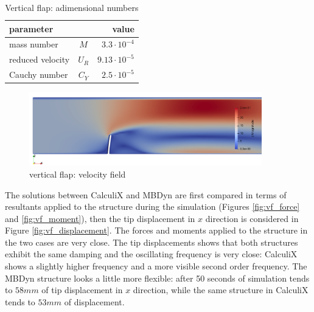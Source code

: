 \begin{table}[!h]
	\begin{center}
		\begin{tabular}{ l c | r } 
			parameter & & value   \\ 
			\hline
			mass number  & $M$ & $3.3\cdot 10^{-4}$     \\
			reduced velocity & $U_R$ & $9.13\cdot 10^{-5}$  \\
			Cauchy number  & $C_Y$ & $2.5\cdot 10^{-5}$  \\			
		\end{tabular}
	\end{center}
	\caption{Vertical flap: adimensional numbers}
	\label{table:ex1-adim}
\end{table}

\begin{figure}[htbp!]
	\centering
	\includegraphics[width=0.9\textwidth]{images/vert_flap/vert_flap1.png}
	\caption{vertical flap: velocity field}
	\label{fig:vf_sol}
\end{figure}


The solutions between CalculiX and MBDyn are first compared in terms of resultants applied to the structure during the simulation (Figures \ref{fig:vf_force} and \ref{fig:vf_moment}), then the tip displacement in $x$ direction is considered in Figure \ref{fig:vf_displacement}. The forces and moments applied to the structure in the two cases are very close. 
The tip displacements shows that both structures exhibit the same damping and the oscillating frequency is very close: CalculiX shows a slightly higher frequency and a more visible second order frequency. The MBDyn structure looks a little more flexible: after 50 seconds of simulation tends to $58mm$ of tip displacement in $x$ direction, while the same structure in CalculiX tends to $53mm$ of displacement. 


